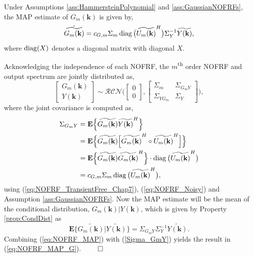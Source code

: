 \begin{thm}
\label{thm:NOFRF_MAP_G}
Under Assumptions \ref{ass:HammersteinPolynomial} and \ref{ass:GaussianNOFRFs}, the MAP estimate of $G_m(\mathbf{k})$ is given by,
\begin{equation}
\label{eq:NOFRF_MAP_G}
\hat{\widetilde{G_m(\mathbf{k})}} = c_{G,m} \Sigma_m \operatorname{diag} \big( \widetilde{U_m(\bold{k})}^H \big) \Sigma_Y^{-1} \widetilde{Y(\bold{k})}, 
\end{equation}
where $\operatorname{diag}(X)$ denotes a diagonal matrix with diagonal $X$.
\end{thm}
\begin{proof*}
Acknowledging the independence of each NOFRF, the $m$\textsuperscript{th} order NOFRF and output spectrum are jointly distributed as,
\begin{equation}
\begin{bmatrix}
G_m(\mathbf{k}) \\ Y(\mathbf{k})
\end{bmatrix} \sim \mathcal{RCN} \Bigg( 
\begin{bmatrix}
0 \\ 0
\end{bmatrix},
\begin{bmatrix}
\Sigma_m & \Sigma_{G_m Y}\\ 
\Sigma_{Y G_m} & \Sigma_Y
\end{bmatrix} \Bigg),
\end{equation}
where the joint covariance is computed as,
\begin{align}
\Sigma_{G_m Y} &= \mathbf{E}\Big\{ \widetilde{G_m(\mathbf{k})} \widetilde{Y(\mathbf{k})}^H \Big\} \nonumber \\
&= \mathbf{E}\Big\{ \widetilde{G_m(\mathbf{k})} \Big[ \widetilde{G_m(\mathbf{k})}^H \circ \widetilde{U_m(\mathbf{k})}^H \Big] \Big\} \nonumber \\
&= \mathbf{E}\Big\{ \widetilde{G_m(\mathbf{k})} \widetilde{G_m(\mathbf{k})}^H \Big\} \cdot \operatorname{diag} \big( \widetilde{U_m(\mathbf{k})}^H \big)  \nonumber \\
&= c_{G,m} \Sigma_m \operatorname{diag} \big( \widetilde{U_m(\mathbf{k})}^H \big), \label{Sigma_GmY}
\end{align}
using (\ref{eq:NOFRF_TransientFree_Chap7}), (\ref{eq:NOFRF_Noisy}) and Assumption \ref{ass:GaussianNOFRFs}. Now the MAP estimate will be the mean of the conditional distribution, $G_m(\mathbf{k})|Y(\mathbf{k})$, which is given by Property \ref{prop:CondDist} as
\begin{equation}
\label{eq:NOFRF_MAP}
\mathbf{E} \Big\{ \widetilde{G_m(\mathbf{k})}|\widetilde{Y(\mathbf{k})} \Big\} = \Sigma_{G_m Y} \Sigma_Y^{-1} \widetilde{Y(\mathbf{k})}.
\end{equation}
Combining (\ref{eq:NOFRF_MAP}) with (\ref{Sigma_GmY}) yields the result in (\ref{eq:NOFRF_MAP_G}). \hfill $\qed$
\end{proof*}

